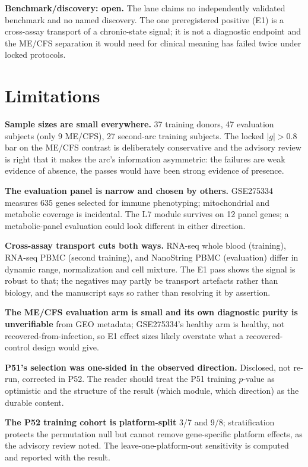 \documentclass[11pt,a4paper]{article}
\begin{document}
\textbf{Benchmark/discovery: open.} The lane claims no independently validated
benchmark and no named discovery. The one preregistered positive (E1) is a
cross-assay transport of a chronic-state signal; it is not a diagnostic
endpoint and the ME/CFS separation it would need for clinical meaning has
failed twice under locked protocols.

\section{Limitations}
\textbf{Sample sizes are small everywhere.} 37 training donors, 47 evaluation
subjects (only 9 ME/CFS), 27 second-arc training subjects. The locked
$|g|>0.8$ bar on the ME/CFS contrast is deliberately conservative and the
advisory review is right that it makes the arc's information asymmetric: the
failures are weak evidence of absence, the passes would have been strong
evidence of presence.

\textbf{The evaluation panel is narrow and chosen by others.} GSE275334
measures 635 genes selected for immune phenotyping; mitochondrial and
metabolic coverage is incidental. The L7 module survives on 12 panel genes;
a metabolic-panel evaluation could look different in either direction.

\textbf{Cross-assay transport cuts both ways.} RNA-seq whole blood
(training), RNA-seq PBMC (second training), and NanoString PBMC (evaluation)
differ in dynamic range, normalization and cell mixture. The E1 pass shows
the signal is robust to that; the negatives may partly be transport artefacts
rather than biology, and the manuscript says so rather than resolving it by
assertion.

\textbf{The ME/CFS evaluation arm is small and its own diagnostic purity is
unverifiable} from GEO metadata; GSE275334's healthy arm is healthy, not
recovered-from-infection, so E1 effect sizes likely overstate what a
recovered-control design would give.

\textbf{P51's selection was one-sided in the observed direction.} Disclosed,
not re-run, corrected in P52. The reader should treat the P51 training
$p$-value as optimistic and the structure of the result (which module, which
direction) as the durable content.

\textbf{The P52 training cohort is platform-split} 3/7 and 9/8; stratification
protects the permutation null but cannot remove gene-specific platform
effects, as the advisory review noted. The leave-one-platform-out sensitivity
is computed and reported with the result.
\end{document}

